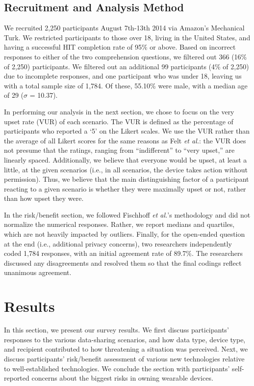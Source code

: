 \documentclass{acm_proc_article-sp}
\begin{document}
\subsection{Recruitment and Analysis Method}
We recruited 2,250 participants August 7th-13th 2014 via Amazon's Mechanical Turk. We restricted participants to those over 18, living in the United States, and having a successful HIT completion rate of 95\% or above. Based on incorrect responses to either of the two comprehension questions, we filtered out 366 (16\% of 2,250) participants. We filtered out an additional 99 participants (4\% of 2,250) due to incomplete responses, and one participant who was under 18, leaving us with a total sample size of 1,784. Of these, 55.10\% were male, with a median age of 29 ($\sigma$ = 10.37).

In performing our analysis in the next section, we chose to focus on the very upset rate (VUR) of each scenario.  The VUR is defined as the percentage of participants who reported a `5' on the Likert scales.
We use the VUR rather than the average of all Likert scores for the same reasons as Felt {\it et al.}: the VUR does not presume that the ratings, ranging from ``indifferent'' to ``very upset,'' are linearly spaced. Additionally, we believe that everyone would be upset, at least a little, at the given scenarios (i.e., in all scenarios, the device takes action without permission). Thus, we believe that the main distinguishing factor of a participant reacting to a given scenario is whether they were maximally upset or not, rather than how upset they were.

In the risk/benefit section, we followed Fischhoff {\it et al.}'s methodology and did not normalize the numerical responses. Rather, we report medians and quartiles, which are not heavily impacted by outliers. Finally, for the open-ended question at the end (i.e., additional privacy concerns), two researchers independently coded 1,784 responses, with an initial agreement rate of 89.7\%. The researchers discussed any disagreements and resolved them so that the final codings reflect unanimous agreement.


\section{Results}
In this section, we present our survey results. We first discuss participants' responses to the various data-sharing scenarios, and how data type, device type, and recipient contributed to how threatening a situation was perceived. Next, we discuss participants' risk/benefit assessment of various new technologies relative to well-established technologies. We conclude the section with participants' self-reported concerns about the biggest risks in owning wearable devices.
\end{document}

